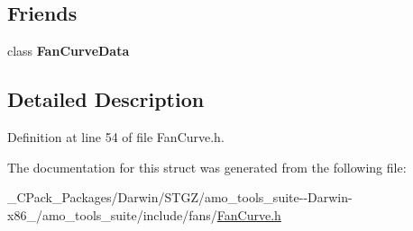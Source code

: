 \subsection*{Friends}
\begin{DoxyCompactItemize}
\item 
\mbox{\label{struct_fan_curve_data_1_1_base_curve_a6c0df668730aa3a6673d279f2bbe7799}} 
class {\bfseries Fan\+Curve\+Data}
\end{DoxyCompactItemize}


\subsection{Detailed Description}


Definition at line 54 of file Fan\+Curve.\+h.



The documentation for this struct was generated from the following file\+:\begin{DoxyCompactItemize}
\item 
\+\_\+\+C\+Pack\+\_\+\+Packages/\+Darwin/\+S\+T\+G\+Z/amo\+\_\+tools\+\_\+suite-\/-\/\+Darwin-\/x86\+\_/amo\+\_\+tools\+\_\+suite/include/fans/\hyperlink{___c_pack___packages_2_darwin_2_s_t_g_z_2amo__tools__suite--_darwin-x86__64_2amo__tools__suite_2include_2fans_2_fan_curve_8h}{Fan\+Curve.\+h}\end{DoxyCompactItemize}
